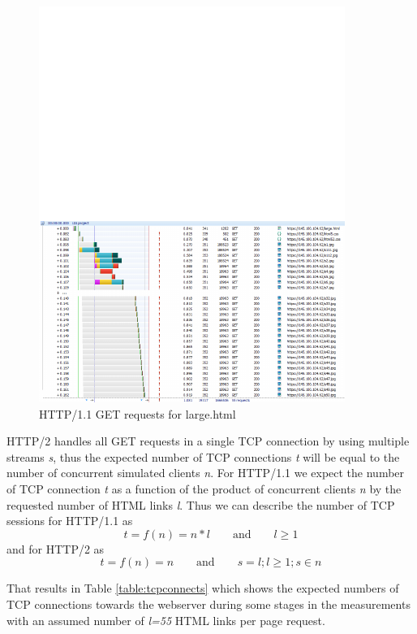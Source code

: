\begin{figure}[H]
	\centering
	\includegraphics[scale=2,trim=0.0cm .0cm .0cm 4.5cm,clip]{images/http.pdf}
	\caption{HTTP/1.1 GET requests for large.html}
	\label{fig:httpwatch}
\end{figure}

HTTP/2 handles all GET requests in a single TCP connection by using multiple streams \textit{s}, thus the expected number of TCP connections \textit{t} will be equal to the number of concurrent simulated clients \textit{n}. For HTTP/1.1  we expect the number of TCP connection \textit{t} as a function of the product of concurrent clients \textit{n} by the requested number of HTML links \textit{l}. Thus we can describe the number of TCP sessions for HTTP/1.1 as \begin{equation}
t=f(n)=n*l \qquad \text{and} \qquad l \geq 1\end{equation} and for HTTP/2 as \begin{equation} t=f(n)=n \qquad \text{and} \qquad s=l; l\geq 1; s \in n \end{equation}

That results in Table \ref{table:tcpconnects} which shows the expected numbers of TCP connections towards the webserver during some stages in the measurements with an assumed number of \textit{l=55} HTML links per page request.

